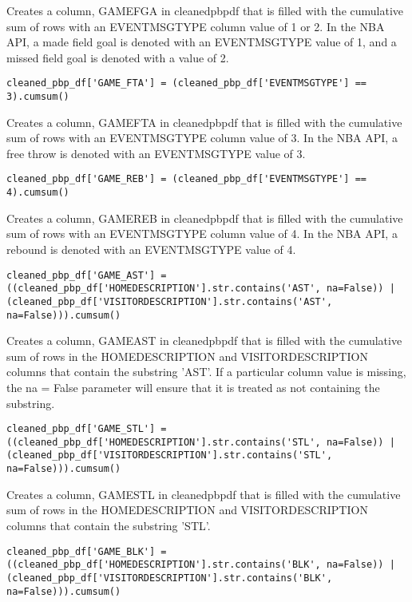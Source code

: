 \documentclass{article}
\begin{document}
Creates a column, GAME\textunderscore FGA in cleaned\textunderscore pbp\textunderscore df that is filled with the cumulative sum of rows with an EVENTMSGTYPE column value of 1 or 2. In the NBA API, a made field goal is denoted with an EVENTMSGTYPE value of 1, and a missed field goal is denoted with a value of 2.
\begin{lstlisting}
cleaned_pbp_df['GAME_FTA'] = (cleaned_pbp_df['EVENTMSGTYPE'] == 3).cumsum()
\end{lstlisting}
Creates a column, GAME\textunderscore FTA in cleaned\textunderscore pbp\textunderscore df that is filled with the cumulative sum of rows with an EVENTMSGTYPE column value of 3. In the NBA API, a free throw is denoted with an EVENTMSGTYPE value of 3.
\begin{lstlisting}
cleaned_pbp_df['GAME_REB'] = (cleaned_pbp_df['EVENTMSGTYPE'] == 4).cumsum()
\end{lstlisting}
Creates a column, GAME\textunderscore REB in cleaned\textunderscore pbp\textunderscore df that is filled with the cumulative sum of rows with an EVENTMSGTYPE column value of 4. In the NBA API, a rebound is denoted with an EVENTMSGTYPE value of 4.
\begin{lstlisting}
cleaned_pbp_df['GAME_AST'] = ((cleaned_pbp_df['HOMEDESCRIPTION'].str.contains('AST', na=False)) | (cleaned_pbp_df['VISITORDESCRIPTION'].str.contains('AST', na=False))).cumsum()
\end{lstlisting}
Creates a column, GAME\textunderscore AST in cleaned\textunderscore pbp\textunderscore df that is filled with the cumulative sum of rows in the HOMEDESCRIPTION and VISITORDESCRIPTION columns that contain the substring 'AST'. If a particular column value is missing, the na = False parameter will ensure that it is treated as not containing the substring.
\begin{lstlisting}
cleaned_pbp_df['GAME_STL'] = ((cleaned_pbp_df['HOMEDESCRIPTION'].str.contains('STL', na=False)) | (cleaned_pbp_df['VISITORDESCRIPTION'].str.contains('STL', na=False))).cumsum()
\end{lstlisting}
Creates a column, GAME\textunderscore STL in cleaned\textunderscore pbp\textunderscore df that is filled with the cumulative sum of rows in the HOMEDESCRIPTION and VISITORDESCRIPTION columns that contain the substring 'STL'.
\begin{lstlisting}
cleaned_pbp_df['GAME_BLK'] = ((cleaned_pbp_df['HOMEDESCRIPTION'].str.contains('BLK', na=False)) | (cleaned_pbp_df['VISITORDESCRIPTION'].str.contains('BLK', na=False))).cumsum()
\end{lstlisting}
\end{document}

